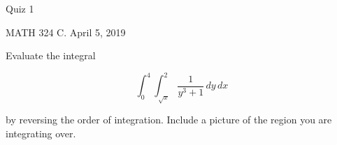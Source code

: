 \documentclass{exam}
\begin{document}
 
\begin{center} \begin{Large} Quiz 1\end{Large}

\vspace{5mm}
MATH 324 C. April 5, 2019
\end{center} 

\vspace{5mm}

\begin{center}
\end{center}

\vspace{1cm}
 

\vspace{1cm}

\begin{questions}
\question Evaluate the integral 

\[
\int_0^4 \int_{\sqrt{x}}^2 \frac{1}{y^3+1} \, dy \, dx 
\]

by reversing the order of integration. Include a picture of the region you are integrating over. 

\end{questions}
\end{document}
